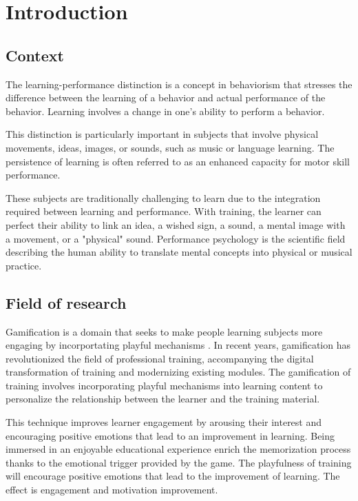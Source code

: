 \chapter{Introduction}

\section{Context}

The learning-performance distinction is a concept in behaviorism that stresses the difference between the learning of a behavior and actual performance of the behavior. Learning involves a change in one's ability to perform a behavior. \cite{kantak2012learning}

This distinction is particularly important in subjects that involve physical movements, ideas, images, or sounds, such as music or language learning.
The persistence of learning is often referred to as an enhanced capacity for motor skill performance. \cite{kantak2012learning}

These subjects are traditionally challenging to learn due to the integration required between learning and performance. 
With training, the learner can perfect their ability to link an idea, a wished sign, a sound, a mental image with a movement, or a "physical" sound. Performance psychology is the scientific field describing the human ability to translate mental concepts into physical or musical practice.

\section{Field of research}

Gamification is a domain that seeks to make people learning subjects more engaging by incorportating playful mechanisms \cite[]{saleem2022gamification}.
In recent years, gamification has revolutionized the field of professional training, accompanying the digital transformation of training and modernizing existing modules. The gamification of training involves incorporating playful mechanisms into learning content to personalize the relationship between the learner and the training material.

This technique improves learner engagement by arousing their interest and encouraging positive emotions that lead to an improvement in learning. Being immersed in an enjoyable educational experience enrich the memorization process thanks to the emotional trigger provided by the game. The playfulness of training will encourage positive emotions that lead to the improvement of learning. The effect is engagement and motivation improvement.

